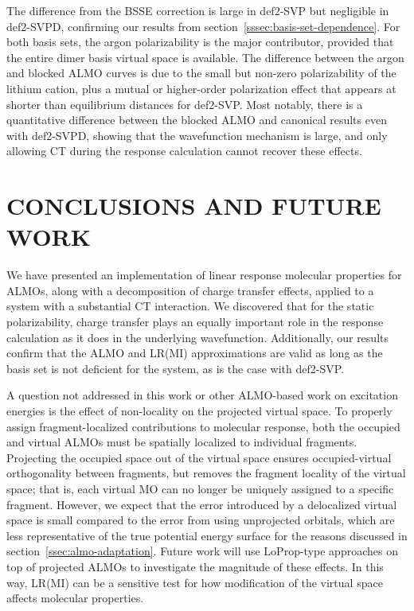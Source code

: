 \documentclass[%
  class = book,%
  crop = false,%
  float = true,%
  multi = true,%
  preview = false,%
]{standalone}
\let\cite\autocite
\newcommand{\caps}[1]{\uppercase{#1}}
\begin{document}
The difference from the BSSE correction is large in def2-SVP but negligible in def2-SVPD, confirming our results from section~\ref{sssec:basis-set-dependence}. For both basis sets, the argon polarizability is the major contributor, provided that the entire dimer basis virtual space is available. The difference between the argon and blocked ALMO curves is due to the small but non-zero polarizability of the lithium cation, plus a mutual or higher-order polarization effect that appears at shorter than equilibrium distances for def2-SVP. Most notably, there is a quantitative difference between the blocked ALMO and canonical results even with def2-SVPD, showing that the wavefunction mechanism is large, and only allowing CT during the response calculation cannot recover these effects.

\section{\texorpdfstring{\caps{Conclusions and Future Work}}{Conclusions and Future Work}}
\label{sec:conclusions-and-future-work}

We have presented an implementation of linear response molecular properties for ALMOs, along with a decomposition of charge transfer effects, applied to a system with a substantial CT interaction. We discovered that for the static polarizability, charge transfer plays an equally important role in the response calculation as it does in the underlying wavefunction. Additionally, our results confirm that the ALMO and LR(MI) approximations are valid as long as the basis set is not deficient for the system, as is the case with def2-SVP.

A question not addressed in this work or other ALMO-based work on excitation energies\cite{Closser_2015_5791,doi:10.1063/1.4926837} is the effect of non-locality on the projected virtual space. To properly assign fragment-localized contributions to molecular response, both the occupied and virtual ALMOs must be spatially localized to individual fragments. Projecting the occupied space out of the virtual space ensures occupied-virtual orthogonality between fragments, but removes the fragment locality of the virtual space; that is, each virtual MO can no longer be uniquely assigned to a specific fragment. However, we expect that the error introduced by a delocalized virtual space is small compared to the error from using unprojected orbitals, which are less representative of the true potential energy surface for the reasons discussed in section~\ref{ssec:almo-adaptation}. Future work will use LoProp-type approaches on top of projected ALMOs to investigate the magnitude of these effects. In this way, LR(MI) can be a sensitive test for how modification of the virtual space affects molecular properties.
\end{document}
